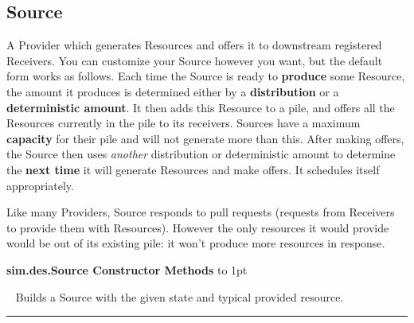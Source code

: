 \documentclass[twoside,10pt]{article}
\newcommand\class[1]{\index{Classes!{#1}}\textsf{#1}}
\newcommand*{\xfill}[1][0pt]{%
	\cleaders
		\hbox to 1pt{\hss
			\raisebox{#1}{\rule{1.2pt}{0.4pt}}%
			\hss}\hfill}
\newenvironment{methods}[1]{
\vspace{1.0em}\noindent\textsf{\textbf{#1 Methods}}\quad \xfill[0.5ex]
\vspace{-0.25em}
\begin{description}
\small}
{\end{description}\hrule\vspace{1.5em}}
\newcommand{\mthd}[1]{\item[{\sf #1}]~\newline}
\begin{document}
\subsection{Source}

A Provider which generates Resources and offers it to downstream registered Receivers.  You can customize your Source however you want, but the default form works as follows.  Each time the Source is ready to {\bf produce} some Resource, the amount it produces is determined either by a {\bf distribution} or a {\bf deterministic amount}.  It then adds this Resource to a pile, and offers all the Resources currently in the pile to its receivers.  Sources have a maximum {\bf capacity} for their pile and will not generate more than this.  After making offers, the Source then uses {\it another} distribution or deterministic amount to determine the {\bf next time} it will generate Resources and make offers.  It schedules itself appropriately.

Like many Providers, Source responds to pull requests (requests from Receivers to provide them with Resources).  However the only resources it would provide would be out of its existing pile: it won't produce more resources in response.

\begin{methods}{\class{sim.des.Source} Constructor}
\mthd{public Source(SimState state, Resource typicalProvided)}
Builds a Source with the given state and typical provided resource.
\end{methods}
\end{document}
